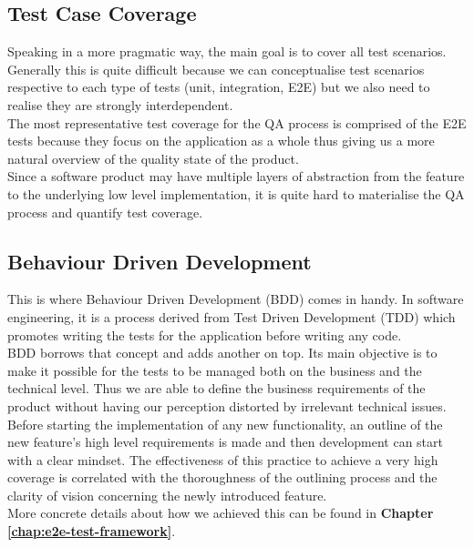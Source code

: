 \subsection{Test Case Coverage}
\label{subsec:test-case-coverage}

Speaking in a more pragmatic way, the main goal is to cover all test scenarios. Generally this is quite difficult because we can conceptualise test scenarios respective to each type of tests (unit, integration, E2E) but we also need to realise they are strongly interdependent.
\\

The most representative test coverage for the QA process is comprised of the E2E tests because they focus on the application as a whole thus giving us a more natural overview of the quality state of the product.
\\

Since a software product may have multiple layers of abstraction from the feature to the underlying low level implementation, it is quite hard to materialise the QA process and quantify test coverage.

\subsection{Behaviour Driven Development}
\label{subsubsec:bdd}

This is where Behaviour Driven Development (BDD) comes in handy. In software engineering, it is a process derived from Test Driven Development (TDD) which promotes writing the tests for the application before writing any code.
\\

BDD borrows that concept and adds another on top. Its main objective is to make it possible for the tests to be managed both on the business and the technical level. Thus we are able to define the business requirements of the product without having our perception distorted by irrelevant technical issues. Before starting the implementation of any new functionality, an outline of the new feature's high level requirements is made and then development can start with a clear mindset. The effectiveness of this practice to achieve a very high coverage is correlated with the thoroughness of the outlining process and the clarity of vision concerning the newly introduced feature.
\\

More concrete details about how we achieved this can be found in \textbf{Chapter \ref{chap:e2e-test-framework}}.

